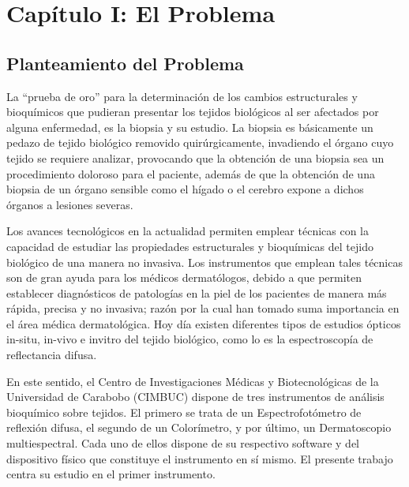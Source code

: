 \documentclass[12pt, a4paper]{article}
\begin{document}
\section{Cap\'{i}tulo I: El Problema}

\subsection{Planteamiento del Problema}
La ``prueba de oro'' para la determinaci\'{o}n de los cambios estructurales y bioqu\'{i}micos que pudieran presentar  los  tejidos  biol\'{o}gicos  al  ser  afectados  por  alguna  enfermedad, es la biopsia y su estudio. La  biopsia  es b\'{a}sicamente un pedazo  de tejido biol\'{o}gico removido quir\'{u}rgicamente, invadiendo el  \'{o}rgano  cuyo  tejido  se  requiere  analizar,  provocando  que  la  obtenci\'{o}n  de  una  biopsia  sea  un procedimiento  doloroso  para  el  paciente,  adem\'{a}s  de que la  obtenci\'{o}n  de una  biopsia  de  un  \'{o}rgano sensible como el h\'{i}gado o el cerebro expone a dichos \'{o}rganos a lesiones  severas.

Los avances tecnol\'{o}gicos en la actualidad permiten emplear t\'{e}cnicas con la capacidad de estudiar  las propiedades estructurales y bioqu\'{i}micas del tejido biol\'{o}gico de una manera no invasiva. Los instrumentos que emplean tales t\'{e}cnicas son de gran ayuda para los m\'{e}dicos dermat\'{o}logos, debido a que permiten establecer diagn\'{o}sticos de patolog\'{i}as en la piel de los pacientes de manera m\'{a}s r\'{a}pida, precisa y no invasiva; raz\'{o}n por la cual han tomado suma importancia en el \'{a}rea m\'{e}dica dermatol\'{o}gica. Hoy d\'{i}a existen diferentes tipos de estudios \'{o}pticos in-situ, in-vivo e invitro del tejido biol\'{o}gico, como lo es la espectroscop\'{i}a de reflectancia difusa.

En este sentido, el Centro de Investigaciones M\'{e}dicas y Biotecnol\'{o}gicas de la Universidad de Carabobo (CIMBUC) dispone de tres instrumentos de an\'{a}lisis bioqu\'{i}mico sobre tejidos. El primero se trata de un Espectrofot\'{o}metro de reflexi\'{o}n difusa, el segundo de un Color\'{i}metro, y por \'{u}ltimo, un Dermatoscopio multiespectral. Cada uno de ellos dispone de su respectivo software y del dispositivo f\'{i}sico que constituye el instrumento en s\'{i} mismo. El presente trabajo centra su estudio en el primer instrumento.
\end{document}
